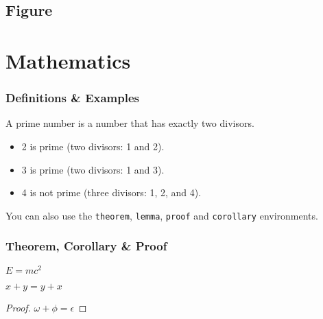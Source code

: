 \subsection{Figure}


\section{Mathematics}

\begin{frame}
    \frametitle{Definitions \& Examples}

    \begin{definition}
        A \alert{prime number} is a number that has exactly two divisors.
    \end{definition}

    \smallskip %

    \begin{example}
        \begin{itemize}
            \item 2 is prime (two divisors: 1 and 2).
            \item 3 is prime (two divisors: 1 and 3).
            \item 4 is not prime (\alert{three} divisors: 1, 2, and 4).
        \end{itemize}
    \end{example}

    \smallskip %

    You can also use the \texttt{theorem}, \texttt{lemma}, \texttt{proof} and \texttt{corollary} environments.
\end{frame}


\begin{frame}
    \frametitle{Theorem, Corollary \& Proof}

    \begin{theorem}
        $E = mc^2$
    \end{theorem}

    \begin{corollary}
        $x + y = y + x$
    \end{corollary}

    \begin{proof}
        $\omega + \phi = \epsilon$
    \end{proof}
\end{frame}

